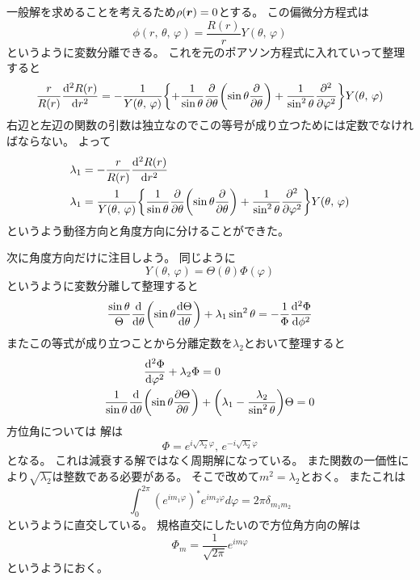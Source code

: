 \documentclass[../../master.tex]{subfiles}
\begin{document}
一般解を求めることを考えるため\(\rho(\vb*{r})=0\)とする。
この偏微分方程式は
\begin{equation}
	\phi(r,\,\theta,\,\varphi) = \frac{R(r)}{r}Y(\theta,\,\varphi)
\end{equation}
というように変数分離できる。
これを元のポアソン方程式に入れていって整理すると
\begin{equation}
	\frac{r}{R(r)}\dv[2]{R(r)}{r}
	= -\frac{1}{Y(\theta,\,\varphi)}\qty{
		+\frac{1}{\sin\theta}\pdv{\theta}
		\qty(\sin\theta\pdv{\theta})
		+ \frac{1}{\sin^2\theta}\pdv[2]{\varphi}}Y(\theta,\,\varphi)
\end{equation}
右辺と左辺の関数の引数は独立なのでこの等号が成り立つためには定数でなければならない。
よって
\begin{align}
	\lambda_1 & =-\frac{r}{R(r)}\dv[2]{R(r)}{r} \\
	\lambda_1 & = \frac{1}{Y(\theta,\,\varphi)}
	\qty{
		\frac{1}{\sin\theta}\pdv{\theta}
		\qty(\sin\theta\pdv{\theta})
		+ \frac{1}{\sin^2\theta}\pdv[2]{\varphi}}Y(\theta,\,\varphi)
\end{align}
というよう動径方向と角度方向に分けることができた。

次に角度方向だけに注目しよう。
同じように
\begin{equation}
	Y(\theta,\,\varphi) = \Theta(\theta)\Phi(\varphi)
\end{equation}
というように変数分離して整理すると
\begin{equation}
	\frac{\sin\theta}{\Theta}\dv{\theta}\qty(\sin\theta\dv{\Theta}{\theta}) + \lambda_1 \sin^2\theta
	= -\frac{1}{\Phi}\dv[2]{\Phi}{\phi}
\end{equation}
またこの等式が成り立つことから分離定数を\(\lambda_2\)とおいて整理すると
\begin{align}
	\dv[2]{\Phi}{\varphi} + \lambda_2 \Phi                               & =0                                                       \\
	\frac{1}{\sin\theta}\dv{\theta} \qty(\sin\theta\pdv{\Theta}{\theta}) & + \qty(\lambda_1-\frac{\lambda_2}{\sin^2\theta})\Theta=0
\end{align}
方位角については
解は
\begin{equation}
	\Phi = e^{i\sqrt{\lambda_2}\varphi},\,e^{-i\sqrt{\lambda_2}\varphi}
\end{equation}
となる。
これは減衰する解ではなく周期解になっている。
また関数の一価性により\(\sqrt{\lambda_2}\)は整数である必要がある。
そこで改めて\(m^2 = \lambda_2\)とおく。
またこれは
\begin{equation}
	\int_{0}^{2\pi} (e^{im_1\varphi})^* e^{im_2\varphi} d\varphi = 2\pi\delta_{m_1 m_2}
\end{equation}
というように直交している。
規格直交にしたいので方位角方向の解は
\begin{equation}
	\Phi_m = \frac{1}{\sqrt{2\pi}} e^{im\varphi}
\end{equation}
というようにおく。
\end{document}
